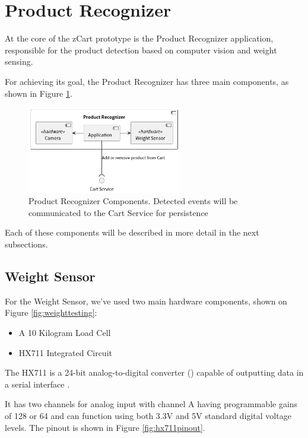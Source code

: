 \documentclass[openright]{normas-utf-tex} %
\begin{document}
\section{Product Recognizer}

At the core of the zCart prototype is the Product Recognizer application,
responsible for the product detection based on computer vision and weight
sensing.

For achieving its goal, the Product Recognizer has three main components, as shown in Figure
\ref{fig:productrecognizerarch}.

\begin{figure}[H]
	\centering
	\includegraphics[width=0.6\textwidth]{./images/diagrams/ProductRecognizer.png}
	\caption[Product Recognizer Components]{Product Recognizer Components. Detected events will be communicated to the Cart Service for persistence}
	\label{fig:productrecognizerarch}
\end{figure}

Each of these components will be described in more detail in the next subsections.

\subsection{Weight Sensor}

For the Weight Sensor, we've used two main hardware components, shown on Figure \ref{fig:weighttesting}:
\begin{itemize}
    \item  A 10 Kilogram Load Cell
    \item HX711 Integrated Circuit
\end{itemize}

The HX711 is a 24-bit analog-to-digital converter ()
capable of outputting data in a serial interface \cite{Avia2022}.

It has two channels for analog input with channel A having programmable gains of 128 or 64 and
can function using both 3.3V and 5V standard digital voltage levels. The pinout is shown
in Figure \ref{fig:hx711pinout}.
\end{document}
